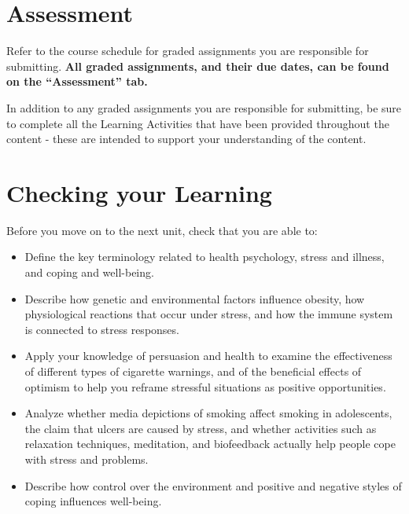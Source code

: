 \documentclass[
]{book}
\begin{document}
\hypertarget{assessment-7}{%
\section*{Assessment}\label{assessment-7}}

\begin{assessment}
Refer to the course schedule for graded assignments you are responsible for submitting. \textbf{All graded assignments, and their due dates, can be found on the ``Assessment'' tab.}

In addition to any graded assignments you are responsible for submitting, be sure to complete all the Learning Activities that have been provided throughout the content - these are intended to support your understanding of the content.
\end{assessment}

\hypertarget{checking-your-learning-7}{%
\section*{Checking your Learning}\label{checking-your-learning-7}}

\begin{progress}
Before you move on to the next unit, check that you are able to:

\begin{itemize}
\item
  Define the key terminology related to health psychology, stress and illness, and coping and well-being.
\item
  Describe how genetic and environmental factors influence obesity, how physiological reactions that occur under stress, and how the immune system is connected to stress responses.
\item
  Apply your knowledge of persuasion and health to examine the effectiveness of different types of cigarette warnings, and of the beneficial effects of optimism to help you reframe stressful situations as positive opportunities.
\item
  Analyze whether media depictions of smoking affect smoking in adolescents, the claim that ulcers are caused by stress, and whether activities such as relaxation techniques, meditation, and biofeedback actually help people cope with stress and problems.
\item
  Describe how control over the environment and positive and negative styles of coping influences well-being.
\end{itemize}
\end{progress}
\end{document}
